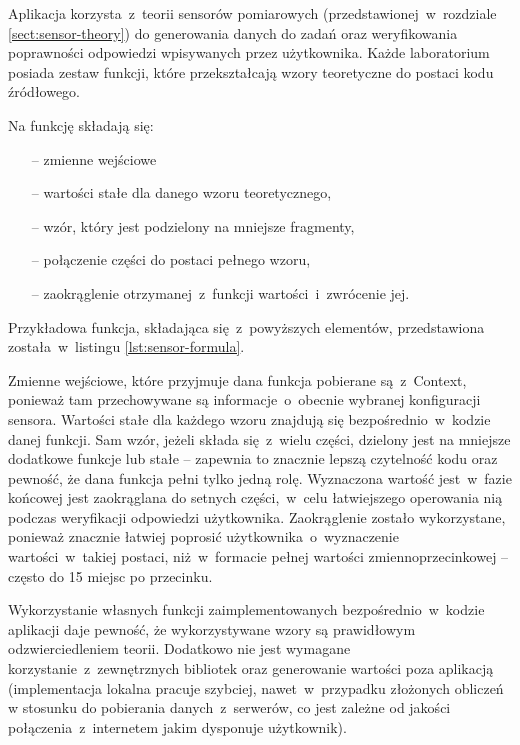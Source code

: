 Aplikacja korzysta~z~teorii sensorów pomiarowych (przedstawionej~w~rozdziale
\ref{sect:sensor-theory}) do generowania danych do zadań oraz weryfikowania poprawności odpowiedzi
wpisywanych przez użytkownika. Każde laboratorium posiada zestaw funkcji, które przekształcają wzory
teoretyczne do postaci kodu źródłowego.

Na funkcję składają się:
\begin{itemize}
  \item[--] zmienne wejściowe
  \item[--] wartości stałe dla danego wzoru teoretycznego,
  \item[--] wzór, który jest podzielony na mniejsze fragmenty,
  \item[--] połączenie części do postaci pełnego wzoru,
  \item[--] zaokrąglenie otrzymanej~z~funkcji wartości~i~zwrócenie jej.
\end{itemize}
Przykładowa funkcja, składająca się~z~powyższych elementów, przedstawiona została~w~listingu
\ref{lst:sensor-formula}.


Zmienne wejściowe, które przyjmuje dana funkcja pobierane są~z~Context, ponieważ tam przechowywane
są informacje~o~obecnie wybranej konfiguracji sensora. Wartości stałe dla każdego wzoru znajdują się
bezpośrednio~w~kodzie danej funkcji. Sam wzór, jeżeli składa się~z~wielu części, dzielony jest na
mniejsze dodatkowe funkcje lub stałe -- zapewnia to znacznie lepszą czytelność kodu oraz pewność, że
dana funkcja pełni tylko jedną rolę. Wyznaczona wartość jest~w~fazie końcowej jest zaokrąglana do
setnych części,~w~celu łatwiejszego operowania nią podczas weryfikacji odpowiedzi użytkownika.
Zaokrąglenie zostało wykorzystane, ponieważ znacznie łatwiej poprosić użytkownika~o~wyznaczenie
wartości~w~takiej postaci, niż~w~formacie pełnej wartości zmiennoprzecinkowej -- często do 15 miejsc
po przecinku.

Wykorzystanie własnych funkcji zaimplementowanych bezpośrednio~w~kodzie aplikacji daje pewność, że
wykorzystywane wzory są prawidłowym odzwierciedleniem teorii. Dodatkowo nie jest wymagane
korzystanie~z~zewnętrznych bibliotek oraz generowanie wartości poza aplikacją (implementacja lokalna
pracuje szybciej, nawet~w~przypadku złożonych obliczeń w stosunku do pobierania danych~z~serwerów,
co jest zależne od jakości połączenia~z~internetem jakim dysponuje użytkownik).